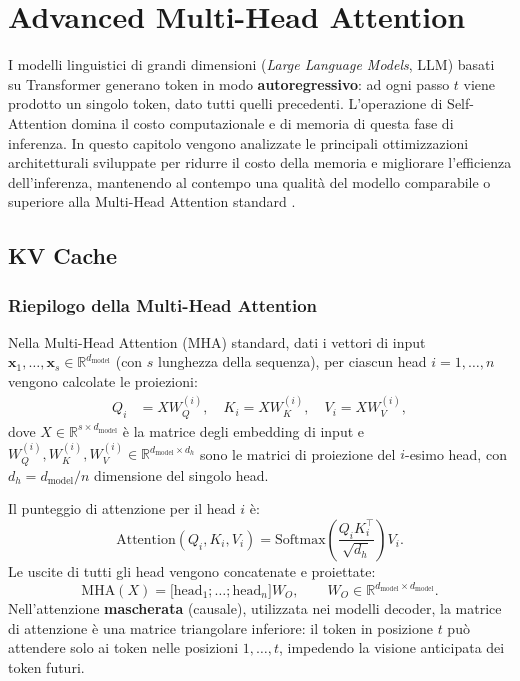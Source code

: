 \chapter{Advanced Multi-Head Attention}
\label{ch:advanced-attention}

I modelli linguistici di grandi dimensioni (\emph{Large Language Models}, LLM)
basati su Transformer generano token in modo \textbf{autoregressivo}: ad ogni
passo $t$ viene prodotto un singolo token, dato tutti quelli precedenti.
L'operazione di Self-Attention domina il costo computazionale e di memoria
di questa fase di inferenza. In questo capitolo vengono analizzate le
principali ottimizzazioni architetturali sviluppate per ridurre il costo
della memoria e migliorare l'efficienza dell'inferenza, mantenendo al
contempo una qualità del modello comparabile o superiore alla Multi-Head
Attention standard \citep{vaswani2017attention,bishop2024}.

\section{KV Cache}
\label{sec:kv-cache}

\subsection{Riepilogo della Multi-Head Attention}
\label{subsec:mha-recap}

Nella Multi-Head Attention (MHA) standard, dati i vettori di input
$\mathbf{x}_1, \ldots, \mathbf{x}_s \in \mathbb{R}^{d_{\text{model}}}$
(con $s$ lunghezza della sequenza), per ciascun head $i = 1,\ldots,n$ vengono
calcolate le proiezioni:
\begin{align}
  Q_i &= X W_Q^{(i)}, \quad K_i = X W_K^{(i)}, \quad V_i = X W_V^{(i)},
\end{align}
dove $X \in \mathbb{R}^{s \times d_{\text{model}}}$ è la matrice degli
embedding di input e $W_Q^{(i)}, W_K^{(i)}, W_V^{(i)} \in
\mathbb{R}^{d_{\text{model}} \times d_h}$ sono le matrici di proiezione del
$i$-esimo head, con $d_h = d_{\text{model}} / n$ dimensione del singolo head.

Il punteggio di attenzione per il head $i$ è:
\begin{equation}
  \text{Attention}(Q_i, K_i, V_i) = \text{Softmax}\!\left(
    \frac{Q_i K_i^\top}{\sqrt{d_h}}
  \right) V_i.
  \label{eq:sdpa}
\end{equation}
Le uscite di tutti gli head vengono concatenate e proiettate:
\begin{equation}
  \text{MHA}(X) = \bigl[\text{head}_1;\ldots;\text{head}_n\bigr] W_O,
  \qquad W_O \in \mathbb{R}^{d_{\text{model}} \times d_{\text{model}}}.
\end{equation}
Nell'attenzione \textbf{mascherata} (causale), utilizzata nei modelli decoder,
la matrice di attenzione è una matrice triangolare inferiore: il token in
posizione $t$ può attendere solo ai token nelle posizioni $1, \ldots, t$,
impedendo la visione anticipata dei token futuri.

